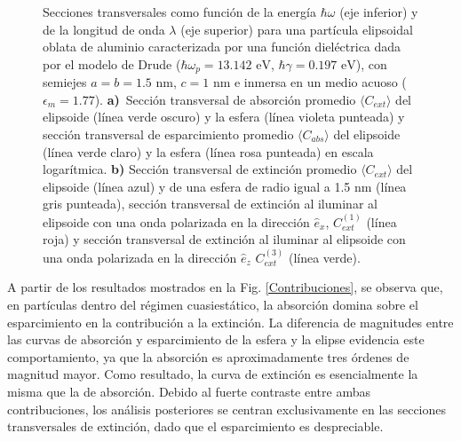 \begin{figure}[h!]
	\quad%
	\caption{Secciones transversales como función de la energía $\hbar\omega$ (eje inferior) y de la longitud de onda $\lambda$ (eje superior) para una partícula elipsoidal oblata de aluminio caracterizada por una función dieléctrica dada por el modelo de Drude ($\hbar\omega_p=13.142\text{ eV}$, $\hbar\gamma=0.197\text{ eV}$), con semiejes $a=b=1.5\text{ nm}$, $c=1\text{ nm}$ e inmersa en un medio acuoso ($\epsilon_m=1.77$). \textbf{a)}~Sección transversal de absorción promedio $\langle C_{ext}\rangle$  del elipsoide (línea verde oscuro) y la esfera (línea violeta punteada) y sección transversal de esparcimiento promedio $\langle C_{abs}\rangle$  del elipsoide (línea verde claro) y la esfera (línea rosa punteada) en escala logarítmica. \textbf{b)} Sección transversal de extinción promedio $\langle C_{ext}\rangle$ del elipsoide (línea azul) y de una esfera de radio igual a 1.5 nm (línea gris punteada), sección transversal de extinción al iluminar al elipsoide con una onda polarizada en la dirección $\hat{e}_x$, $C_{ext}^{(1)}$  (línea roja)  y sección transversal de extinción al iluminar al elipsoide con una onda polarizada en la dirección $\hat{e}_z$ $C_{ext}^{(3)}$  (línea verde).} \label{fig:test}
\end{figure}

A partir de los resultados mostrados en la Fig. \ref{Contribuciones}, se observa que, en partículas dentro del régimen cuasiestático, la absorción domina sobre el esparcimiento en la contribución a la extinción.  La diferencia de magnitudes entre las curvas de absorción y esparcimiento de la esfera y la elipse evidencia este comportamiento, ya que la absorción es aproximadamente tres órdenes de magnitud mayor. Como resultado, la curva de extinción es esencialmente la misma que la de absorción. Debido al fuerte contraste entre ambas contribuciones, los análisis posteriores se centran exclusivamente en las secciones transversales de extinción, dado que el esparcimiento es despreciable.\\

